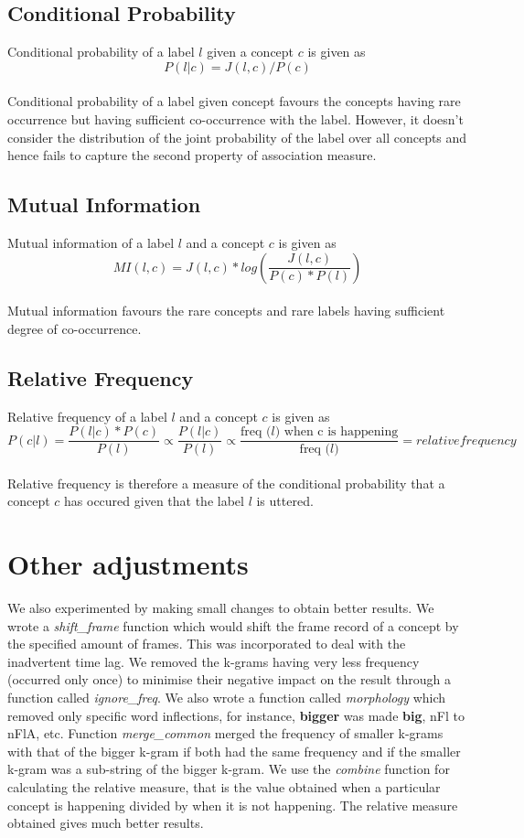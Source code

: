 \documentclass[12pt, a4paper]{report}
\begin{document}
\subsection{Conditional Probability}
Conditional probability of a label $l$ given a concept $c$ is given as\\
$$
P (l|c) = J(l, c)/P (c)
$$
\\
Conditional probability of a label given concept favours the concepts having rare occurrence but having sufficient co-occurrence with the label. However, it doesn’t consider the distribution of the joint probability of the label over all concepts and hence fails to capture the second property of association measure.

\subsection{Mutual Information}
Mutual information of a label $l$ and a concept $c$ is given as\\
$$
MI(l, c) = J(l, c) \ast log(\frac{J(l, c)}{P (c) \ast P (l)})
$$
\\
Mutual information favours the rare concepts and rare labels having sufficient degree of co-occurrence.

\subsection{Relative Frequency}
Relative frequency of a label $l$ and a concept $c$ is given as\\
$$
P(c|l) = \frac{P(l|c) \ast P(c)}{P(l)} \propto \frac{P(l|c)}{P(l)} \propto \frac{\text{freq ($l$) when c is happening}}{\text{freq ($l$)}} = relative frequency
$$
\\
Relative frequency is therefore a measure of the conditional probability that a concept $c$ has occured given that the label $l$ is uttered.

\section{Other adjustments}

We also experimented by making small changes to obtain better results. We wrote a \textit{shift\_frame} function which would shift the frame record of a concept by the specified amount of frames. This was incorporated to deal with the inadvertent time lag. We removed the k-grams having very less frequency (occurred only once) to minimise their negative impact on the result through a function called \textit{ignore\_freq}. We also wrote a function called \textit{morphology} which removed only specific word inflections, for instance, \textbf{bigger} was made \textbf{big}, {\dn nFl\?} to {\dn nFlA}, etc. Function \textit{merge\_common} merged the frequency of smaller k-grams with that of the bigger k-gram if both had the same frequency and if the smaller k-gram was a sub-string of the bigger k-gram. We use the \textit{combine} function for calculating the relative measure, that is the value obtained when a particular concept is happening divided by when it is not happening. The relative measure obtained gives much better results.
\end{document}
